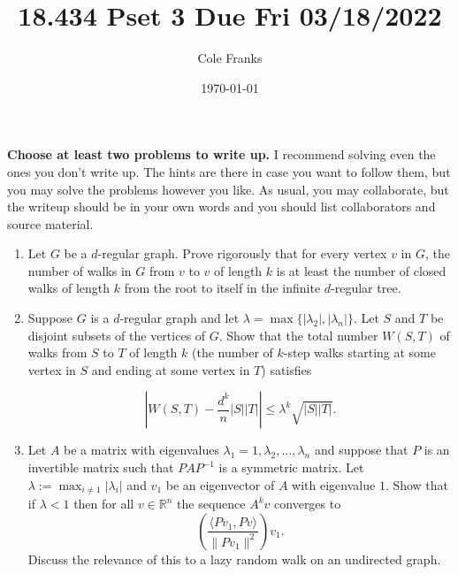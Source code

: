 \documentclass[11pt, oneside]{article}   	%
\title{18.434 Pset 3 Due Fri 03/18/2022}
\author{Cole Franks}
\date{\today}							%
\newcommand{\RR}{\mathbb R}
\theoremstyle{definition}
\begin{document}
\maketitle
\textbf{Choose at least two problems to write up.} I recommend solving even the ones you don't write up. The hints are there in case you want to follow them, but you may solve the problems however you like. As usual, you may collaborate, but the writeup should be in your own words and you should list collaborators and source material.

\begin{enumerate}
\item Let $G$ be a $d$-regular graph. Prove rigorously that for every vertex $v$ in $G$, the number of walks in $G$ from $v$ to $v$ of length $k$ is at least the number of closed walks of length $k$ from the root to itself in the infinite $d$-regular tree.
\item Suppose $G$ is a $d$-regular graph and let $\lambda = \max\{|\lambda_2|, |\lambda_n|\}$. Let $S$ and $T$ be disjoint subsets of the vertices of $G$. Show that the total number $W(S,T)$ of walks from $S$ to $T$ of length $k$ (the number of $k$-step walks starting at some vertex in $S$ and ending at some vertex in $T$) satisfies 

$$\left|W(S, T) - \frac{d^k}{n} |S| |T|  \right| \leq \lambda^k \sqrt{|S||T|}.$$
\item Let $A$ be a matrix with eigenvalues $\lambda_1 = 1, \lambda_2, \dots, \lambda_n$ and suppose that $P$ is an invertible matrix such that $P A P^{-1}$ is a symmetric matrix. Let $\lambda:=\max_{i \neq 1} |\lambda_i|$ and $v_1$ be an eigenvector of $A$ with eigenvalue $1$. Show that if $\lambda < 1$ then for all $v \in \RR^n$ the sequence $A^k v$ converges to  
$$ \left(\frac{\langle Pv_1, P v \rangle }{\|Pv_1\|^2}\right) v_1 .$$
Discuss the relevance of this to a lazy random walk on an undirected graph.
\end{enumerate}
\end{document}
